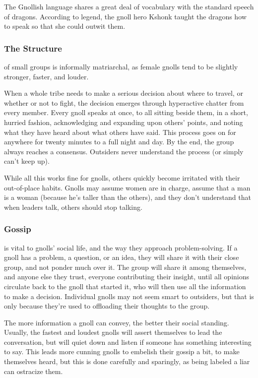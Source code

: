The Gnollish language shares a great deal of vocabulary with the standard speech of dragons.
According to legend, the gnoll hero Kshonk taught the dragons how to speak so that she could outwit them.

\subsubsection{The Structure}
of small groups is informally matriarchal, as female gnolls tend to be slightly stronger, faster, and louder.

When a whole tribe needs to make a serious decision about where to travel, or whether or not to fight, the decision emerges through hyperactive chatter from every member.
Every gnoll speaks at once, to all sitting beside them, in a short, hurried fashion, acknowledging and expanding upon others' points, and noting what they have heard about what others have said.
This process goes on for anywhere for twenty minutes to a full night and day.
By the end, the group always reaches a consensus.
Outsiders never understand the process (or simply can't keep up).

While all this works fine for gnolls, others quickly become irritated with their out-of-place habits.
Gnolls may assume women are in charge, assume that a man is a woman (because he's taller than the others), and they don't understand that when leaders talk, others should stop talking.

\subsubsection{Gossip}
is vital to gnolls' social life, and the way they approach problem-solving. If a gnoll has a problem, a question, or an idea, they will share it with their close group, and not ponder much over it. The group will share it among themselves, and anyone else they trust, everyone contributing their insight, until all opinions circulate back to the gnoll that started it, who will then use all the information to make a decision. Individual gnolls may not seem smart to outsiders, but that is only because they're used to offloading their thoughts to the group.

The more information a gnoll can convey, the better their social standing. Usually, the fastest and loudest gnolls will assert themselves to lead the conversation, but will quiet down and listen if someone has something interesting to say. This leads more cunning gnolls to embelish their gossip a bit, to make themselves heard, but this is done carefully and sparingly, as being labeled a liar can ostracize them.

